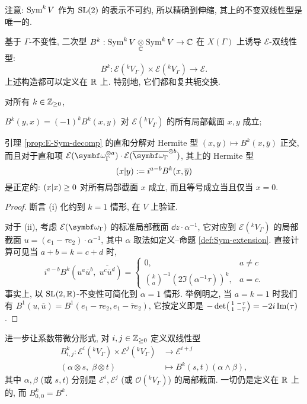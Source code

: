 注意: $\operatorname{Sym}^k V$ 作为 $\operatorname{SL}(2)$ 的表示不可约, 所以精确到伸缩, 其上的不变双线性型是唯一的.

基于 $\Gamma$-不变性, 二次型 $B^k: \operatorname{Sym}^k V \underset{\mathbb{C}}{\otimes} \operatorname{Sym}^k V \to \mathbb{C}$ 在 $X(\Gamma)$ 上诱导 $\mathcal{E}$-双线性型:
\[ B^k: \mathcal{E}({}^k V_\Gamma) \times \mathcal{E}({}^k V_\Gamma) \to \mathcal{E}. \]
上述构造都可以定义在 $\mathbb{R}$ 上. 特别地, 它们都和复共轭交换.

\begin{lemma}
	对所有 $k \in \mathbb{Z}_{\geq 0}$,
	\begin{compactenum}[(i)]
		\item $B^k(y, x) = (-1)^k B^k(x, y)$ 对 $\mathcal{E}({}^k V_\Gamma)$ 的所有局部截面 $x, y$ 成立;
		\item 引理 \ref{prop:E-Sym-decomp} 的直和分解对 Hermite 型 $(x, y) \mapsto B^k(x, \overline{y})$ 正交, 而且对于直和项 $\mathcal{E}(\bomega_\Gamma^{\otimes a}) \cdot \mathcal{E}(\overline{\bomega_\Gamma}^{\otimes b})$, 其上的 Hermite 型
		\[ \left( x \middle| y \right) := i^{a-b} B^k(x, \overline{y}) \]
		是正定的: $\left( x \middle| x \right) \geq 0$ 对所有局部截面 $x$ 成立, 而且等号成立当且仅当 $x = 0$.
	\end{compactenum}
\end{lemma}
\begin{proof}
	断言 (i) 化约到 $k = 1$ 情形, 在 $V$ 上验证.
	
	对于 (ii), 考虑 $\mathcal{E}(\bomega_\Gamma)$ 的标准局部截面 $\dd z \cdot \alpha^{-1}$, 它对应到 $\mathcal{E}({}^k V_\Gamma)$ 的局部截面 $u = (e_1 - \tau e_2) \cdot \alpha^{-1}$, 其中 $\alpha$ 取法如定义--命题 \ref{def:Sym-extension}. 直接计算可见当 $a + b = k = c + d$ 时,
	\begin{equation}\label{eqn:Bk-computation}
		i^{a-b} B^k \left(u^a \overline{u}^b, \; \overline{u^c \overline{u}^d}\right) = \begin{cases}
			0, & a \neq c \\
			{\binom{k}{a}}^{-1} \left( 2\Im(\alpha^{-1}\tau)\right)^k, & a = c.
		\end{cases}
	\end{equation}
	事实上, 以 $\operatorname{SL}(2,\mathbb{R})$-不变性可简化到 $\alpha = 1$ 情形. 举例明之, 当 $a = k = 1$ 时我们有 $B^1\left(u, \overline{u}\right) = B^1(e_1 - \tau e_2, e_1 - \overline{\tau} e_2)$, 它按定义即是 $-\det\bigl(\begin{smallmatrix} 1 & -\tau \\ 1 & -\overline{\tau} \end{smallmatrix}\bigr) = -2i \operatorname{Im}(\tau)$.
\end{proof}

进一步让系数带微分形式, 对 $i, j \in \mathbb{Z}_{\geq 0}$ 定义双线性型
\begin{equation}\label{eqn:Bkij} \begin{aligned}
	B^k_{i,j}: \mathcal{E}^i({}^k V_\Gamma) \times \mathcal{E}^j({}^k V_\Gamma) & \longrightarrow \mathcal{E}^{i+j} \\
	\left( \alpha \otimes s, \; \beta \otimes t\right) & \longmapsto B^k(s, t) (\alpha \wedge \beta),
\end{aligned}\end{equation}
其中 $\alpha, \beta$ (或 $s, t$) 分别是 $\mathcal{E}^i, \mathcal{E}^j$ (或 $\mathcal{O}({}^k V_\Gamma)$) 的局部截面. 一切仍是定义在 $\mathbb{R}$ 上的, 而 $B^k_{0,0} = B^k$.

